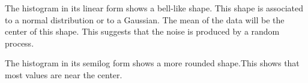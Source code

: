 The histogram in its linear form shows a bell-like shape. This shape is associated to a normal distribution or to a Gaussian. The mean of the data will be the center of this shape. This suggests that the noise is produced by a random process.

The histogram in its semilog form shows a more rounded shape.This shows that most values are near the center. 
